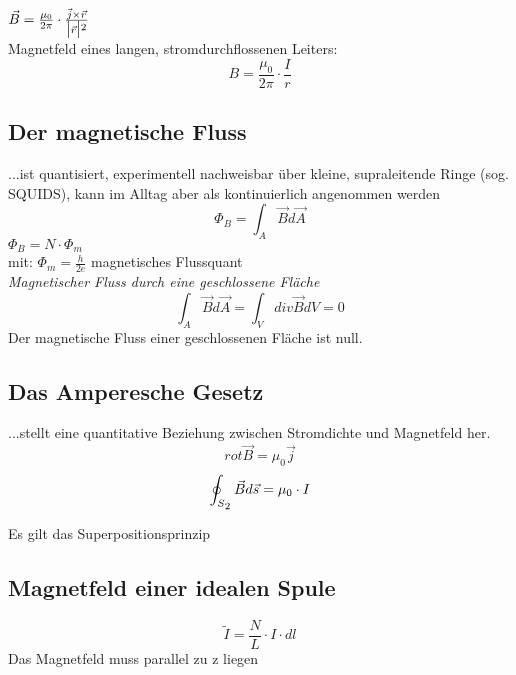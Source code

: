\documentclass[a4paper,12pt]{report}
\begin{document}
$ \vec{B} = \frac{\mu_0}{2\pi} \cdot \frac{\vec{j} \times \vec{r}}{\bigl| \vec{r} \bigl| \textsuperscript{2}}$\\

Magnetfeld eines langen, stromdurchflossenen Leiters: 
\begin{equation}
B = \frac{\mu_0}{2\pi}\cdot \frac{I}{r}
\end{equation}

\subsection{Der magnetische Fluss}
...ist quantisiert, experimentell nachweisbar über kleine, supraleitende Ringe (sog. SQUIDS), kann im Alltag aber als kontinuierlich angenommen werden\\
\begin{equation}
\Phi_B = \int_A \vec{B}d\vec{A}
\end{equation}
$\Phi_B = N\cdot\Phi_m$\\
mit: $\Phi_m = \frac{h}{2e} $ magnetisches Flussquant\\

\emph{Magnetischer Fluss durch eine geschlossene Fläche}
\begin{equation}
\int_A \vec B d \vec A = \int_V div \vec{B} dV = 0
\end{equation}
Der magnetische Fluss einer geschlossenen Fläche ist null.

\subsection{Das Amperesche Gesetz}
...stellt eine quantitative Beziehung zwischen Stromdichte und Magnetfeld her.
\begin{equation}
rot \vec{B} = \mu_0 \vec{j}
\end{equation}
\begin{equation}
\oint_{S\textsubscript{2}} \vec{B}d\vec{s} = \mu_0 \cdot I
\end{equation}

Es gilt das Superpositionsprinzip

\subsection{Magnetfeld einer idealen Spule}
\begin{equation}
\tilde{I} = \frac{N}{L} \cdot I \cdot dl
\end{equation}
Das Magnetfeld muss parallel zu z liegen\\
\end{document}
